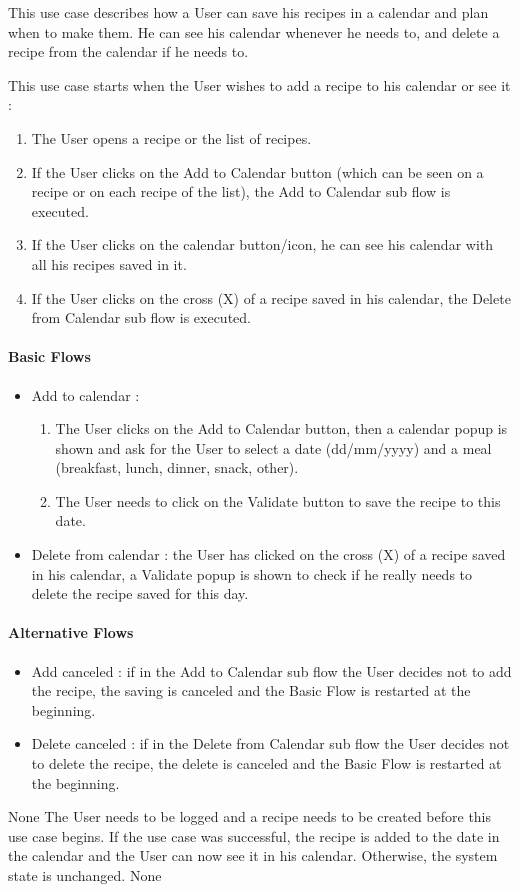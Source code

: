 {
  This use case describes how a User can save his recipes in a calendar and plan when to make them. He can see his calendar whenever he needs to, and delete a recipe from the calendar if he needs to.

}
{
  This use case starts when the User wishes to add a recipe to his calendar or see it :
  \begin{enumerate}
    \item The User opens a recipe or the list of recipes.
    \item If the User clicks on the Add to Calendar button (which can be seen on a recipe or on each recipe of the list), the Add to Calendar sub flow is executed.
    \item If the User clicks on the calendar button/icon, he can see his calendar with all his recipes saved in it.
    \item If the User clicks on the cross (X) of a recipe saved in his calendar, the Delete from Calendar sub flow is executed.
  \end{enumerate}

  \paragraph{Basic Flows}
  \begin{itemize}
    \item Add to calendar :
    \begin{enumerate}
      \item The User clicks on the Add to Calendar button, then a calendar popup is shown and ask for the User to select a date (dd/mm/yyyy) and a meal (breakfast, lunch, dinner, snack, other).
      \item The User needs to click on the Validate button to save the recipe to this date.
    \end{enumerate}
    \item Delete from calendar : the User has clicked on the cross (X) of a recipe saved in his calendar, a Validate popup is shown to check if he really needs to delete the recipe saved for this day.
  \end{itemize}

  \paragraph{Alternative Flows}
  \begin{itemize}
    \item Add canceled : if in the Add to Calendar sub flow the User decides not to add the recipe, the saving is canceled and the Basic Flow is restarted at the beginning.
    \item Delete canceled : if in the Delete from Calendar sub flow the User decides not to delete the recipe, the delete is canceled and the Basic Flow is restarted at the beginning.
  \end{itemize}
}
{None}
{The User needs to be logged and a recipe needs to be created before this use case begins.}
{If the use case was successful, the recipe is added to the date in the calendar and the User can now see it in his calendar. Otherwise, the system state is unchanged.}
{None}